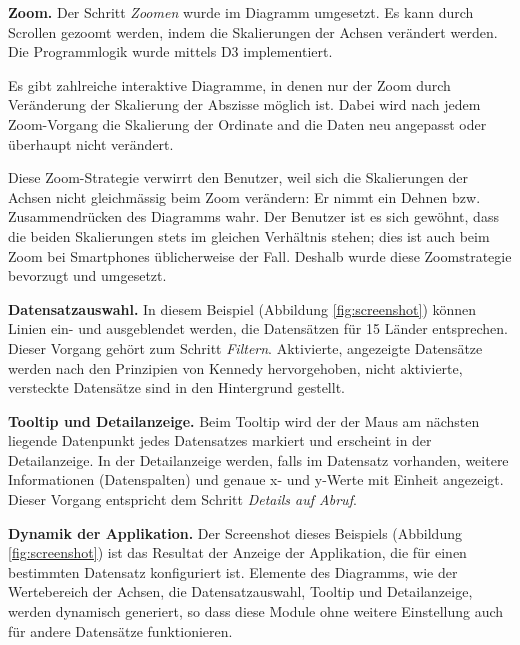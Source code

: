 \textbf{Zoom.} Der Schritt \textit{Zoomen} wurde im Diagramm umgesetzt. Es kann durch Scrollen gezoomt werden, indem die Skalierungen der Achsen verändert werden. Die Programmlogik wurde mittels D3 implementiert. 

Es gibt zahlreiche interaktive Diagramme, in denen nur der Zoom durch Veränderung der Skalierung der Abszisse möglich ist. Dabei wird nach jedem Zoom-Vorgang die Skalierung der Ordinate and die Daten neu angepasst oder überhaupt nicht verändert.

Diese Zoom-Strategie verwirrt den Benutzer, weil sich die Skalierungen der Achsen nicht gleichmässig beim Zoom verändern: Er nimmt ein Dehnen bzw. Zusammendrücken des Diagramms wahr. Der Benutzer ist es sich gewöhnt, dass die beiden Skalierungen stets im gleichen Verhältnis stehen; dies ist auch beim Zoom bei Smartphones üblicherweise der Fall. Deshalb wurde diese Zoomstrategie bevorzugt und umgesetzt.

\textbf{Datensatzauswahl.} In diesem Beispiel (Abbildung \ref{fig:screenshot}) können Linien ein- und ausgeblendet werden, die Datensätzen für 15 Länder entsprechen. Dieser Vorgang gehört zum Schritt \textit{Filtern}. Aktivierte, angezeigte Datensätze werden nach den Prinzipien von Kennedy \cite{pop} hervorgehoben, nicht aktivierte, versteckte Datensätze sind in den Hintergrund gestellt.

\textbf{Tooltip und Detailanzeige.} Beim Tooltip wird der der Maus am nächsten liegende Datenpunkt jedes Datensatzes markiert und erscheint in der Detailanzeige. In der Detailanzeige werden, falls im Datensatz vorhanden, weitere Informationen (Datenspalten) und genaue x- und y-Werte mit Einheit angezeigt. Dieser Vorgang entspricht dem Schritt \textit{Details auf Abruf}.

\textbf{Dynamik der Applikation.} Der Screenshot dieses Beispiels (Abbildung \ref{fig:screenshot}) ist das Resultat der Anzeige der Applikation, die für einen bestimmten Datensatz konfiguriert ist. Elemente des Diagramms, wie der Wertebereich der Achsen, die Datensatzauswahl, Tooltip und Detailanzeige, werden dynamisch generiert, so dass diese Module ohne weitere Einstellung auch für andere Datensätze funktionieren.

